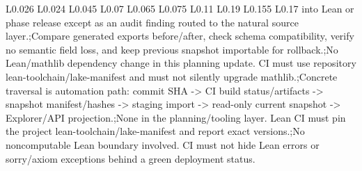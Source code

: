 \begin{longtable}{L{0.026\linewidth} L{0.024\linewidth} L{0.045\linewidth} L{0.07\linewidth} L{0.065\linewidth} L{0.075\linewidth} L{0.11\linewidth} L{0.19\linewidth} L{0.155\linewidth} L{0.17\linewidth}}
into Lean or phase release except as an audit finding routed to the natural source layer.;\newline Compare generated exports before/\allowbreak{}after, check schema compatibility, verify no semantic field loss, and keep previous snapshot importable for rollback.;\newline No Lean/\allowbreak{}mathlib dependency change in this planning update. CI must use repository lean-toolchain/\allowbreak{}lake-manifest and must not silently upgrade mathlib.;\newline Concrete traversal is automation path: commit SHA -> CI build status/\allowbreak{}artifacts -> snapshot manifest/\allowbreak{}hashes -> staging import -> read-only current snapshot -> Explorer/\allowbreak{}API projection.;\newline None in the planning/\allowbreak{}tooling layer. Lean CI must pin the project lean-toolchain/\allowbreak{}lake-manifest and report exact versions.;\newline No noncomputable Lean boundary involved. CI must not hide Lean errors or sorry/\allowbreak{}axiom exceptions behind a green deployment status.\\
\hline
\addlinespace[0.24em]

\end{longtable}
